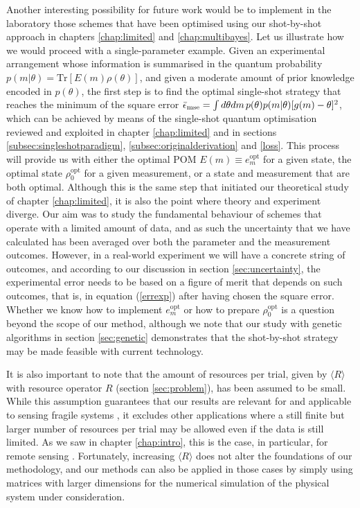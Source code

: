 Another interesting possibility for future work would be to implement in the laboratory those schemes that have been optimised using our shot-by-shot approach in chapters \ref{chap:limited} and \ref{chap:multibayes}. Let us illustrate how we would proceed with a single-parameter example. Given an experimental arrangement whose information is summarised in the quantum probability $p(m|\theta) = \mathrm{Tr}[E(m) \rho(\theta)]$, and given a moderate amount of prior knowledge encoded in $p(\theta)$, the first step is to find the optimal single-shot strategy that reaches the minimum of the square error $\bar{\epsilon}_{\mathrm{mse}} = \int d\theta dm\hspace{0.15em} p(\theta) p(m|\theta) [g(m) - \theta]^2$, which can be achieved by means of the single-shot quantum optimisation reviewed and exploited in chapter \ref{chap:limited} and in sections \ref{subsec:singleshotparadigm}, \ref{subsec:originalderivation} and \ref{loss}. This process will provide us with either the optimal POM $E(m) \equiv e_m^\mathrm{opt}$ for a given state, the optimal state $\rho_0^\mathrm{opt}$ for a given measurement, or a state and measurement that are both optimal. Although this is the same step that initiated our theoretical study of chapter \ref{chap:limited}, it is also the point where theory and experiment diverge. Our aim was to study the fundamental behaviour of schemes that operate with a limited amount of data, and as such the uncertainty that we have calculated has been averaged over both the parameter and the measurement outcomes. However, in a real-world experiment we will have a concrete string of outcomes, and according to our discussion in section \ref{sec:uncertainty}, the experimental error needs to be based on a figure of merit that depends on such outcomes, that is, in equation (\ref{errexp}) after having chosen the square error. Whether we know how to implement $e^\mathrm{opt}_m$ or how to prepare $\rho_0^\mathrm{opt}$ is a question beyond the scope of our method, although we note that our study with genetic algorithms in section \ref{sec:genetic} demonstrates that the shot-by-shot strategy may be made feasible with current technology. 

It is also important to note that the amount of resources per trial, given by $\langle R \rangle$ with resource operator $R$ (section \ref{sec:problem}), has been assumed to be small. While this assumption guarantees that our results are relevant for and applicable to sensing fragile systems \cite{eckert2007, pototschnig2011, carlton2010, taylor2013, taylor2015, taylor2016, PaulProctor2016}, it excludes other applications where a still finite but larger number of resources per trial may be allowed even if the data is still limited. As we saw in chapter \ref{chap:intro}, this is the case, in particular, for remote sensing \cite{shabir2015, kebei2013, lanzagorta2012, wang2016,zhuang2017}. Fortunately, increasing $\langle R \rangle$ does not alter the foundations of our methodology, and our methods can also be applied in those cases by simply using matrices with larger dimensions for the numerical simulation of the physical system under consideration. 

